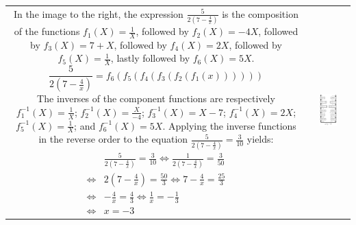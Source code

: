 \documentclass{article}
\begin{document}
\begin{tabular}{cc}
\parbox{0.4\textwidth}{
In the image to the right, the expression \(\frac{5}{2(7 - \frac{4}{x})}\) is the composition of the functions \(f_1(X) = \frac{1}{X}\), followed by \(f_2(X) = -4X\), followed by \(f_3(X) = 7 + X\), followed by \(f_4(X) = 2X\), followed by \(f_5(X) = \frac{1}{X}\), lastly followed by \(f_6(X) = 5X\).
\[\frac{5}{2(7 - \frac{4}{x})} = f_6(f_5(f_4(f_3(f_2(f_1(x))))))\]
The inverses of the component functions are respectively \(f_1^{-1}(X) = \frac{1}{X}\); \(f_2^{-1}(X) = \frac{X}{-4}\); \(f_3^{-1}(X) = X - 7\); \(f_4^{-1}(X) = 2X\); \(f_5^{-1}(X) = \frac{1}{X}\); and \(f_6^{-1}(X) = 5X\). Applying the inverse functions in the reverse order to the equation \(\frac{5}{2(7 - \frac{4}{x})} = \frac{3}{10}\) yields:
\begin{align*}
& \frac{5}{2(7 - \frac{4}{x})} = \frac{3}{10} 
\iff \frac{1}{2(7 - \frac{4}{x})} = \frac{3}{50} \\
\iff & 2(7 - \frac{4}{x}) = \frac{50}{3} 
\iff 7 - \frac{4}{x} = \frac{25}{3} \\
\iff & -\frac{4}{x} = \frac{4}{3} 
\iff \frac{1}{x} = -\frac{1}{3} \\
\iff & x = -3
\end{align*}
} & \parbox{0.5\textwidth}{
\includegraphics[width = 0.5\textwidth]{solving_equation_1}
}
\end{tabular}
\end{document}
